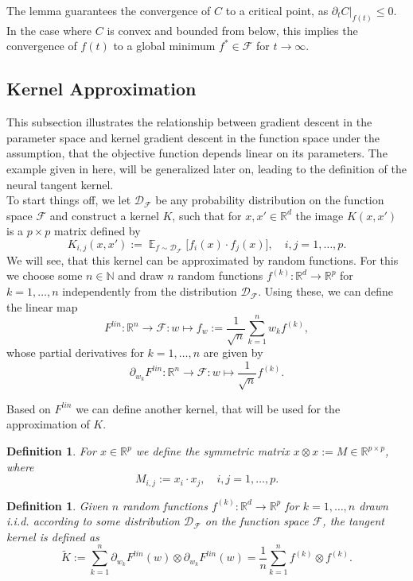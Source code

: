 \documentclass[11pt, a4paper]{article}
\newtheorem{definition}[theorem]{Definition}
\newcommand{\N}{\mathds{N}}
\newcommand{\R}{\mathds{R}}
\newcommand{\D}{\mathcal{D}}
\newcommand{\F}{\mathcal{F}}
\DeclareMathOperator*{\E}{\mathds{E}}
\begin{document}
The lemma guarantees the convergence of $C$ to a critical point, as $\partial_tC|_{f(t)} \leq 0$. In the case where $C$ is convex and bounded from below, this implies the convergence of $f(t)$ to a global minimum $f^* \in \F$ for $t \to \infty$.

\subsection{Kernel Approximation} \label{sec:approximation}

This subsection illustrates the relationship between gradient descent in the parameter space and kernel gradient descent in the function space under the assumption, that the objective function depends linear on its parameters. The example given in here, will be generalized later on, leading to the definition of the neural tangent kernel. \\

To start things off, we let $\D_{\F}$ be any probability distribution on the function space $\F$ and construct a kernel $K$, such that for $x,x' \in \R^d$ the image $K(x,x')$ is a $p \times p$ matrix defined by
\[ K_{i,j}(x,x') := \E_{f \sim \D_{\F}} \Big [ f_i(x) \cdot f_j(x) \Big ], \quad i,j=1,\dots,p. \]
We will see, that this kernel can be approximated by random functions. For this we choose some $n \in \N$ and draw $n$ random functions $f^{(k)} : \R^d \to \R^p$ for $k=1,\dots,n$ independently from the distribution $\D_{\F}$. Using these, we can define the linear map
\[ F^\textit{lin}: \R^n \to \F : w \mapsto f_w := \frac{1}{\sqrt{n}} \sum_{k=1}^{n}w_kf^{(k)}, \]
whose partial derivatives for $k=1,\dots,n$ are given by
\[ \partial_{w_{k}}F^\textit{lin} : \R^n \to \F: w \mapsto \frac{1}{\sqrt{n}}f^{(k)}. \]

Based on $F^\textit{lin}$ we can define another kernel, that will be used for the approximation of $K$.

\begin{definition}
For $x \in \R^p$ we define the symmetric matrix $x \otimes x := M \in \R^{p \times p}$, where
\[ M_{i,j} := x_i \cdot x_j, \quad  i,j=1,\dots,p. \]
\end{definition}

\begin{definition}
Given $n$ random functions $f^{(k)} : \R^d \to \R^p$ for $k=1,\dots,n$ drawn i.i.d. according to some distribution $\D_{\F}$ on the function space $\F$, the tangent kernel is defined as
\[ \tilde{K} := \sum_{k=1}^{n} \partial_{w_k} F^\textit{lin}(w) \otimes \partial_{w_k} F^\textit{lin}(w) = \frac{1}{n} \sum_{k=1}^{n} f^{(k)} \otimes f^{(k)}. \]
\end{definition}
\end{document}
